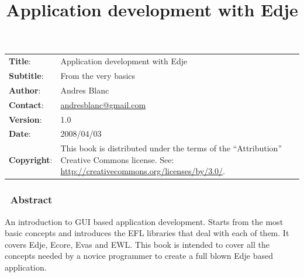 \documentclass[12pt,a4paper,english]{book}
\title{Application development with Edje}
\author{}
\date{}
\newlength{\docinfowidth}
\newlength{\locallinewidth}
\begin{document}
\maketitle

\begin{center}
\begin{tabularx}{\docinfowidth}{lX}
\textbf{Title}: &
	Application development with Edje \\
\textbf{Subtitle}: &
	From the very basics \\
\textbf{Author}: &
	Andres Blanc \\
\textbf{Contact}: &
	\href{mailto:andresblanc@gmail.com}{andresblanc@gmail.com} \\
\textbf{Version}: &
	1.0 \\
\textbf{Date}: &
	2008/04/03 \\
\textbf{Copyright}: &
	This book is distributed under the terms of the ``Attribution''
Creative Commons license. See: \href{http://creativecommons.org/licenses/by/3.0/}{http://creativecommons.org/licenses/by/3.0/}. \\
\end{tabularx}
\end{center}

\setlength{\locallinewidth}{\linewidth}


\subsubsection*{~\hfill Abstract\hfill ~}

An introduction to GUI based application development. Starts from
the most basic concepts and introduces the EFL libraries that deal
with each of them. It covers Edje, Ecore, Evas and EWL. This book
is intended to cover all the concepts needed by a novice programmer
to create a full blown Edje based application.

\tableofcontents

\bigskip



\hypertarget{book-overview}{}
\end{document}
